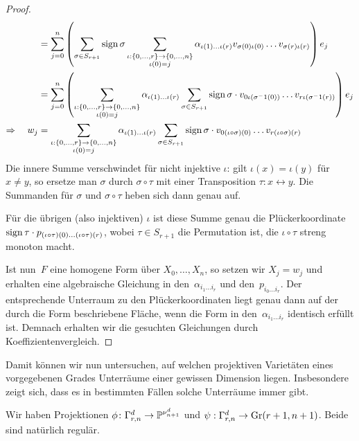 \begin{proof}
\begin{align*}
	&= \sum_{j=0}^n \left(\sum\limits_{\sigma \in S_{r+1}} \operatorname{sign} \sigma \sum_{\substack{\iota: \{0, \dots, r\} \rightarrow \{0, \dots, n\} \\ \iota(0)=j }} \alpha_{\iota(1) \dots \iota(r)} v_{\sigma(0)\iota(0)} \dots v_{\sigma(r)\iota(r)}\right) e_j \\
	&= \sum_{j=0}^n \left(\sum_{\substack{\iota: \{0, \dots, r\} \rightarrow \{0, \dots, n\} \\ \iota(0)=j }} \alpha_{\iota(1) \dots \iota(r)} \sum\limits_{\sigma \in S_{r+1}} \operatorname{sign} \sigma \cdot v_{0\iota(\sigma^-1(0))} \dots v_{r\iota(\sigma^-1(r))}\right) e_j \\
\Rightarrow\quad w_j	&= \sum_{\substack{\iota: \{0, \dots, r\} \rightarrow \{0, \dots, n\} \\ \iota(0)=j }} \alpha_{\iota(1) \dots \iota(r)} \sum\limits_{\sigma \in S_{r+1}} \operatorname{sign} \sigma \cdot v_{0(\iota\circ\sigma)(0)} \dots v_{r(\iota\circ\sigma)(r)}
\end{align*}
Die innere Summe verschwindet für nicht injektive $\iota$: gilt $\iota(x) = \iota(y)$ für $x \neq y$, so ersetze man $\sigma$ durch $\sigma \circ \tau$ mit einer Transposition $\tau: x \leftrightarrow y$. Die Summanden für $\sigma$ und $\sigma \circ \tau$ heben sich dann genau auf.

Für die übrigen (also injektiven) $\iota$ ist diese Summe genau die Plückerkoordinate $\operatorname{sign} \tau \cdot p_{(\iota\circ\tau)(0)\dots(\iota\circ\tau)(r)}$, wobei $\tau \in S_{r+1}$ die Permutation ist, die $\iota \circ \tau$ streng monoton macht.

Ist nun~$F$ eine homogene Form über $X_0, \dots, X_n$, so setzen wir $X_j = w_j$ und erhalten eine algebraische Gleichung in den~$\alpha_{i_1 \dots i_r}$ und den~$p_{i_0 \dots i_r}$. Der entsprechende Unterraum zu den Plückerkoordinaten liegt genau dann auf der durch die Form beschriebene Fläche, wenn die Form in den~$\alpha_{i_1 \dots i_r}$ identisch erfüllt ist. Demnach erhalten wir die gesuchten Gleichungen durch Koeffizientenvergleich.
\end{proof}

Damit können wir nun untersuchen, auf welchen projektiven Varietäten eines vorgegebenen Grades Unterräume einer gewissen Dimension liegen. Insbesondere zeigt sich, dass es in bestimmten Fällen solche Unterräume immer gibt.

Wir haben Projektionen $\phi \colon \Gamma_{r,n}^d \rightarrow \mathbb P^{\nu_{n+1}^d}$ und $\psi: \Gamma_{r,n}^d \to \grass r+1/{n+1}$. Beide sind natürlich regulär.

